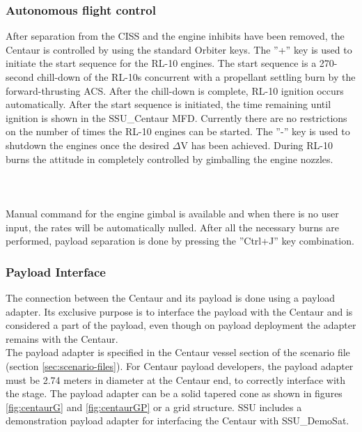 \documentclass[Space_Shuttle_Ultra_Manual.tex]{subfiles}
\begin{document}
\begin{multicols*}{2}
\subsubsection{Autonomous flight control}
After separation from the CISS and the engine inhibits have been removed, the Centaur is controlled by using the standard Orbiter keys. The ''+'' key is used to initiate the start sequence for the RL-10 engines. The start sequence is a 270-second chill-down of the RL-10s concurrent with a propellant settling burn by the forward-thrusting ACS. After the chill-down is complete, RL-10 ignition occurs automatically. After the start sequence is initiated, the time remaining until ignition is shown in the SSU\_Centaur MFD. Currently there are no restrictions on the number of times the RL-10 engines can be started. The ''-'' key is used to shutdown the engines once the desired $\Delta$V has been achieved. During RL-10 burns the attitude in completely controlled by gimballing the engine nozzles.
\\
\\
\\
\\
Manual command for the engine gimbal is available and when there is no user input, the rates will be automatically nulled. After all the necessary burns are performed, payload separation is done by pressing the ''Ctrl+J'' key combination.

\subsubsection{Payload Interface}
The connection between the Centaur and its payload is done using a payload adapter. Its exclusive purpose is to interface the payload with the Centaur and is considered a part of the payload, even though on payload deployment the adapter remains with the Centaur.\\
The payload adapter is specified in the Centaur vessel section of the scenario file (section \ref{sec:scenario-files}).
For Centaur payload developers, the payload adapter must be 2.74 meters in diameter at the Centaur end, to correctly interface with the stage. The payload adapter can be a solid tapered cone as shown in figures \ref{fig:centaurG} and \ref{fig:centaurGP} or a grid structure. SSU includes a demonstration payload adapter for interfacing the Centaur with SSU\_DemoSat.

\end{multicols*}
\newpage
\end{document}
